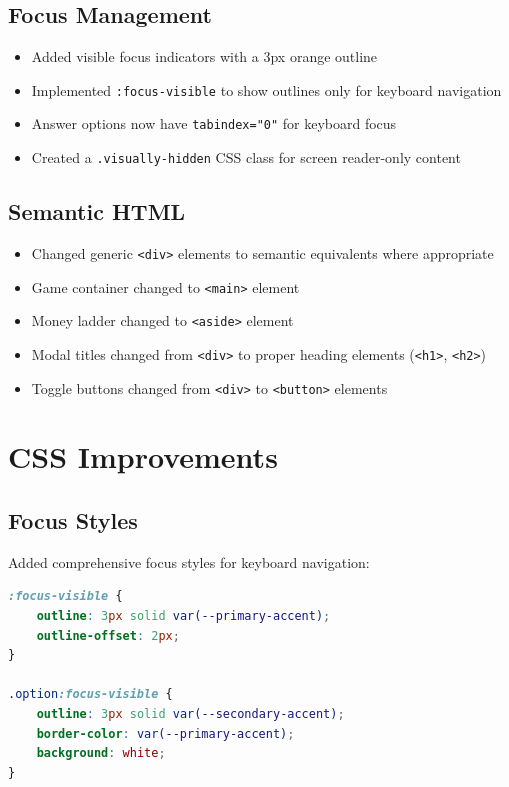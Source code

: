 \documentclass[11pt,a4paper]{article}
\begin{document}
\subsection{Focus Management}

\begin{itemize}
    \item Added visible focus indicators with a 3px orange outline
    \item Implemented \texttt{:focus-visible} to show outlines only for keyboard navigation
    \item Answer options now have \texttt{tabindex="0"} for keyboard focus
    \item Created a \texttt{.visually-hidden} CSS class for screen reader-only content
\end{itemize}

\subsection{Semantic HTML}

\begin{itemize}
    \item Changed generic \texttt{<div>} elements to semantic equivalents where appropriate
    \item Game container changed to \texttt{<main>} element
    \item Money ladder changed to \texttt{<aside>} element
    \item Modal titles changed from \texttt{<div>} to proper heading elements (\texttt{<h1>}, \texttt{<h2>})
    \item Toggle buttons changed from \texttt{<div>} to \texttt{<button>} elements
\end{itemize}

\section{CSS Improvements}

\subsection{Focus Styles}

Added comprehensive focus styles for keyboard navigation:

\begin{lstlisting}[language=CSS]
:focus-visible {
    outline: 3px solid var(--primary-accent);
    outline-offset: 2px;
}

.option:focus-visible {
    outline: 3px solid var(--secondary-accent);
    border-color: var(--primary-accent);
    background: white;
}
\end{lstlisting}
\end{document}
